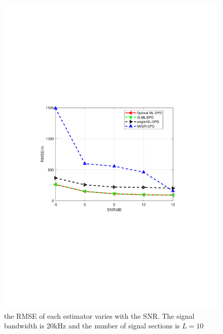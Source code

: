 \documentclass[review]{elsarticle}
\begin{document}
\begin{figure}[!t]
    \centerline{\includegraphics[width=1\textwidth]{pdfFigures/SNRvsRMSE(opt-IS(2000)-SML-MVDR(1))L10.pdf}}
    \centering
	\caption{the RMSE of each estimator varies with the SNR. The signal bandwidth is $20$kHz and the number of signal sections is $L=10$}\label{fig5}
\end{figure}
\end{document}
